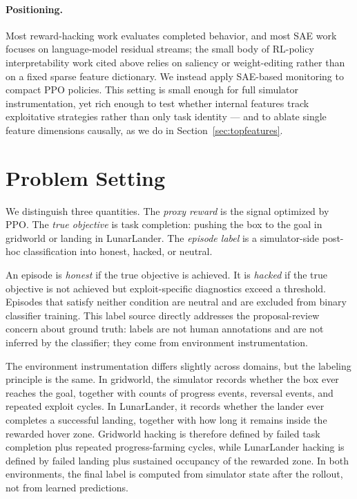 \documentclass[11pt]{article}
\begin{document}
\paragraph{Positioning.}
Most reward-hacking work evaluates completed behavior, and most SAE work focuses on language-model residual streams; the small body of RL-policy interpretability work cited above relies on saliency or weight-editing rather than on a fixed sparse feature dictionary. We instead apply SAE-based monitoring to compact PPO policies. This setting is small enough for full simulator instrumentation, yet rich enough to test whether internal features track exploitative strategies rather than only task identity --- and to ablate single feature dimensions causally, as we do in Section~\ref{sec:topfeatures}.

\section{Problem Setting}

We distinguish three quantities. The \emph{proxy reward} is the signal optimized by PPO. The \emph{true objective} is task completion: pushing the box to the goal in gridworld or landing in LunarLander. The \emph{episode label} is a simulator-side post-hoc classification into honest, hacked, or neutral.

An episode is \emph{honest} if the true objective is achieved. It is \emph{hacked} if the true objective is not achieved but exploit-specific diagnostics exceed a threshold. Episodes that satisfy neither condition are neutral and are excluded from binary classifier training. This label source directly addresses the proposal-review concern about ground truth: labels are not human annotations and are not inferred by the classifier; they come from environment instrumentation.

The environment instrumentation differs slightly across domains, but the
labeling principle is the same. In gridworld, the simulator records whether
the box ever reaches the goal, together with counts of progress events,
reversal events, and repeated exploit cycles. In LunarLander, it records
whether the lander ever completes a successful landing, together with how long
it remains inside the rewarded hover zone. Gridworld hacking is therefore
defined by failed task completion plus repeated progress-farming cycles, while
LunarLander hacking is defined by failed landing plus sustained occupancy of
the rewarded zone. In both environments, the final label is computed from
simulator state after the rollout, not from learned predictions.
\end{document}
